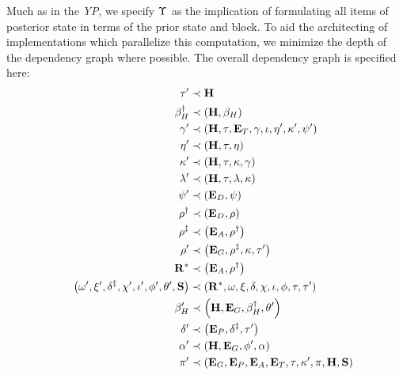 Much as in the \emph{YP}, we specify $\Upsilon$ as the implication of formulating all items of posterior state in terms of the prior state and block. To aid the architecting of implementations which parallelize this computation, we minimize the depth of the dependency graph where possible. The overall dependency graph is specified here:
\begin{align}\label{eq:transitionfunctioncomposition}
  \thetime' &\prec \theheader \\
  \recenthistorypostparentstaterootupdate &\prec \tup{\theheader, \recenthistory} \label{eq:betadagger} \\
  \safrole' &\prec \tup{\theheader, \thetime, \xttickets, \safrole, \stagingset, \entropy', \activeset', \disputes'} \\
  \entropy' &\prec \tup{\theheader, \thetime, \entropy} \\
  \activeset' &\prec \tup{\theheader, \thetime, \activeset, \safrole} \\
  \previousset' &\prec \tup{\theheader, \thetime, \previousset, \activeset} \\
  \disputes' &\prec \tup{\xtdisputes, \disputes} \\
  \availassignmentspostjudgment &\prec \tup{\xtdisputes, \availassignments} \label{eq:rhodagger} \\
  \availassignmentspostassurances &\prec \tup{\xtassurances, \availassignmentspostjudgment} \label{eq:rhoddagger} \\
  \availassignments' &\prec \tup{\xtguarantees, \availassignmentspostassurances, \activeset, \thetime'} \label{eq:rhoprime} \\
  \justbecameavailable^* &\prec \tup{\xtassurances, \availassignmentspostjudgment} \\
  \tup{\ready', \accumulated', \accountspostxfer, \privileges', \stagingset', \authqueue', \lastaccout', \accumulationstatistics} &\prec \tup{\justbecameavailable^*, \ready, \accumulated, \accountspre, \privileges, \stagingset, \authqueue, \thetime, \thetime'} \label{eq:accountspostxfer} \\
  \recenthistory' &\prec \tup{\theheader, \xtguarantees, \recenthistorypostparentstaterootupdate, \lastaccout'} \label{eq:betaprime} \\
  \accountspostpreimage &\prec \tup{\xtpreimages, \accountspostxfer, \thetime'} \label{eq:accountspostpreimage} \\
  \authpool' &\prec \tup{\theheader, \xtguarantees, \authqueue', \authpool} \\
  \activity' &\prec \tup{\xtguarantees, \xtpreimages, \xtassurances, \xttickets, \thetime, \activeset', \activity, \theheader, \accumulationstatistics}\!\!\!\!\!\!\!\!
\end{align}

